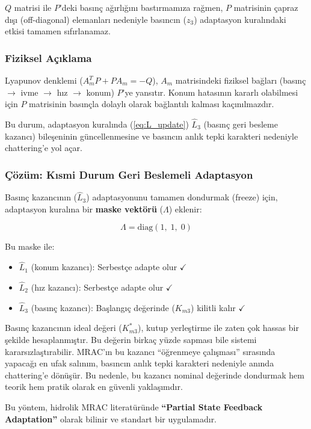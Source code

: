 \documentclass[12pt,a4paper]{article}
\begin{document}
$Q$ matrisi ile $P$'deki basınç ağırlığını bastırmamıza rağmen, $P$ matrisinin çapraz dışı (off-diagonal) elemanları nedeniyle basıncın ($z_3$) adaptasyon kuralındaki etkisi tamamen sıfırlanamaz.

\subsubsection{Fiziksel Açıklama}
Lyapunov denklemi ($A_m^T P + P A_m = -Q$), $A_m$ matrisindeki fiziksel bağları (basınç $\to$ ivme $\to$ hız $\to$ konum) $P$'ye yansıtır. Konum hatasının kararlı olabilmesi için $P$ matrisinin basınçla dolaylı olarak bağlantılı kalması kaçınılmazdır.

Bu durum, adaptasyon kuralında (\ref{eq:L_update}) $\hat{L}_3$ (basınç geri besleme kazancı) bileşeninin güncellenmesine ve basıncın anlık tepki karakteri nedeniyle chattering'e yol açar.

\subsubsection{Çözüm: Kısmi Durum Geri Beslemeli Adaptasyon}

Basınç kazancının ($\hat{L}_3$) adaptasyonunu tamamen dondurmak (freeze) için, adaptasyon kuralına bir \textbf{maske vektörü} ($\Lambda$) eklenir:

\begin{equation}
    \Lambda = \text{diag}(1,\; 1,\; 0)
    \label{eq:mask}
\end{equation}

Bu maske ile:
\begin{itemize}
    \item $\hat{L}_1$ (konum kazancı): Serbestçe adapte olur $\checkmark$
    \item $\hat{L}_2$ (hız kazancı): Serbestçe adapte olur $\checkmark$
    \item $\hat{L}_3$ (basınç kazancı): Başlangıç değerinde ($K_{m3}$) kilitli kalır $\checkmark$
\end{itemize}

\begin{cozum}
Basınç kazancının ideal değeri ($K_{m3}^*$), kutup yerleştirme ile zaten çok hassas bir şekilde hesaplanmıştır. Bu değerin birkaç yüzde sapması bile sistemi kararsızlaştırabilir. MRAC'ın bu kazancı ``öğrenmeye çalışması'' sırasında yapacağı en ufak salınım, basıncın anlık tepki karakteri nedeniyle anında chattering'e dönüşür. Bu nedenle, bu kazancı nominal değerinde dondurmak hem teorik hem pratik olarak en güvenli yaklaşımdır.

Bu yöntem, hidrolik MRAC literatüründe \textbf{``Partial State Feedback Adaptation''} olarak bilinir ve standart bir uygulamadır.
\end{cozum}
\end{document}
